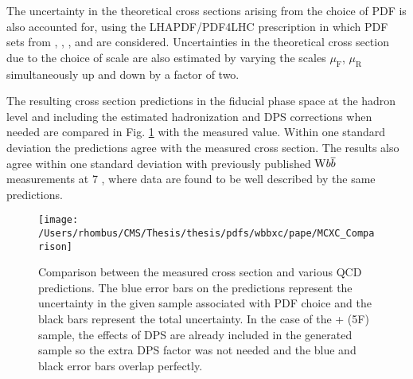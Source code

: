 The uncertainty in the theoretical cross sections arising
 from the choice of PDF is also accounted for,
 using the LHAPDF/PDF4LHC \cite{LHAPDF,Botje:2011sn,Alekhin:2011sk,Ball:2012cx}
 prescription in which
 PDF sets from \CTEQ, \MSTW, \NNPDF, and \HERA are considered.
Uncertainties in the theoretical cross section due to the
 choice of scale are also estimated by varying the scales
 $\mu_{\mathrm{F}}$, $\mu_{\mathrm{R}}$ simultaneously
 up and down by a factor of two.

The resulting cross section predictions in the fiducial
 phase space at the hadron level and including the estimated
 hadronization and DPS corrections when needed
 are compared in Fig. \ref{fig:xc_comparison}
 with the measured value.
Within one standard deviation the predictions agree with the measured cross section.
The results also agree within one standard deviation with previously published $\mathrm{W} b\overline{b}$
 measurements at 7 \TeV, where
 data are found to be well described by the same predictions.

\begin{figure}[htbp]
\caption[Cross section comparison for \wbb and generators]{
 Comparison between the measured \wbb cross section and
  various QCD predictions.
 The blue error bars on the predictions represent the uncertainty in
  the given sample associated with PDF choice and
  the black bars represent the total uncertainty.
 In the case of the \MADGRAPH + \PYTHIAs (5F) sample,
  the effects of DPS are already included in the generated
  sample so the extra DPS factor was not needed and the blue
  and black error bars overlap perfectly.
 }
\center
\texttt{[image: /Users/rhombus/CMS/Thesis/thesis/pdfs/wbbxc/pape/MCXC\_Comparison]}
\label{fig:xc_comparison}
\end{figure}

